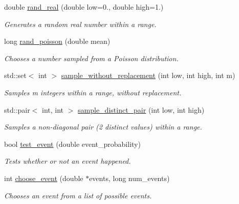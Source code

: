\begin{DoxyCompactItemize}
double \mbox{\hyperlink{classrcombinator_1_1RandMaths_aa6441baa59bff50f588c0c54e3c54140}{rand\+\_\+real}} (double low=0., double high=1.)
\begin{DoxyCompactList}\small\item\em Generates a random real number within a range. \end{DoxyCompactList}\item 
long \mbox{\hyperlink{classrcombinator_1_1RandMaths_a1fec117f0ebd5a7834fdcf649a23edd7}{rand\+\_\+poisson}} (double mean)
\begin{DoxyCompactList}\small\item\em Chooses a number sampled from a Poisson distribution. \end{DoxyCompactList}\item 
std\+::set$<$ int $>$ \mbox{\hyperlink{classrcombinator_1_1RandMaths_a2c31949c9ac03952cb0006e6a88e3d85}{sample\+\_\+without\+\_\+replacement}} (int low, int high, int m)
\begin{DoxyCompactList}\small\item\em Samples {\itshape m} integers within a range, without replacement. \end{DoxyCompactList}\item 
std\+::pair$<$ int, int $>$ \mbox{\hyperlink{classrcombinator_1_1RandMaths_aaa759efa3059b6793100cb6b6442f26d}{sample\+\_\+distinct\+\_\+pair}} (int low, int high)
\begin{DoxyCompactList}\small\item\em Samples a non-\/diagonal pair (2 distinct values) within a range. \end{DoxyCompactList}\item 
bool \mbox{\hyperlink{classrcombinator_1_1RandMaths_a183686140a9da18ad40c7e048ee8914e}{test\+\_\+event}} (double event\+\_\+probability)
\begin{DoxyCompactList}\small\item\em Tests whether or not an event happened. \end{DoxyCompactList}\item 
int \mbox{\hyperlink{classrcombinator_1_1RandMaths_afbc0d35bd9744ecab1983914ac32d68c}{choose\+\_\+event}} (double $\ast$events, long num\+\_\+events)
\begin{DoxyCompactList}\small\item\em Chooses an event from a list of possible events. \end{DoxyCompactList}\end{DoxyCompactItemize}
\textbf{ }\par
